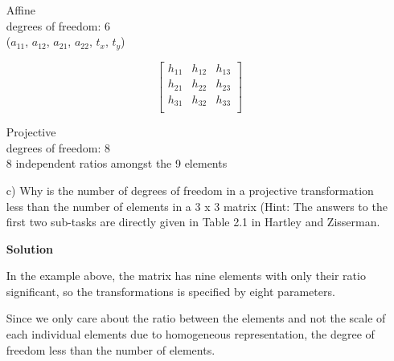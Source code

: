 \documentclass[a4paper,12pt]{article}
\begin{document}
\begin{itemize}
\begin{center}
Affine \\degrees of freedom: 6 \\($a_{11}$, $a_{12}$, $a_{21}$, $a_{22}$, $t_x$, $t_y$)

	$$
	\begin{bmatrix} 
		h_{11}&h_{12}&h_{13}\\
		h_{21}&h_{22}&h_{23}\\
		h_{31}&h_{32}&h_{33}\\
	\end{bmatrix}$$
	
Projective \\degrees of freedom: 8 \\8 independent ratios amongst the 9 elements

\end{center}

\item[c)]  Why is the number of degrees of freedom in a projective transformation less than the number of elements in a 3 x 3 matrix
(Hint: The answers to the first two sub-tasks are directly given in Table 2.1 in Hartley
and Zisserman.

\textbf{Solution}

In the example above, the matrix has nine elements with only their ratio significant, so the transformations is specified by eight parameters. 

Since we only care about the ratio between the elements and not the scale of each individual elements due to homogeneous representation, the degree of freedom less than the number of elements.

\end{itemize}
\end{document}
